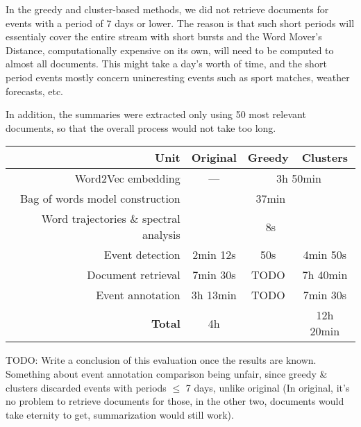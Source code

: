 In the greedy and cluster-based methods, we did not retrieve documents for events with a period of 7 days or lower. The reason is that such short periods will essentialy cover the entire stream with short bursts and the Word Mover's Distance, computationally expensive on its own, will need to be computed to almost all documents. This might take a day's worth of time, and the short period events mostly concern unineresting events such as sport matches, weather forecasts, etc.

In addition, the summaries were extracted only using 50 most relevant documents, so that the overall process would not take too long.

\hspace{\fill}

\begin{minipage}{\linewidth}
\centering
\begin{tabular}{ r c c c }\toprule[1.5pt]
\bf Unit & \bf Original & \bf Greedy & \bf Clusters \\ \midrule
Word2Vec embedding & --- & \multicolumn{2}{c}{3h 50min} \\
Bag of words model construction & \multicolumn{3}{c}{37min} \\
Word trajectories \& spectral analysis & \multicolumn{3}{c}{8s} \\
Event detection & 2min 12s & 50s & 4min 50s \\
Document retrieval & 7min 30s & {\color{red} TODO} & 7h 40min \\
Event annotation & 3h 13min & {\color{red} TODO} & 7min 30s \\ \midrule
\bf Total & 4h & & 12h 20min\\ \bottomrule[1.25pt]

\end{tabular}\par
{} \label{tab:title}
\end{minipage}

\hspace{\fill}

{\color{red} TODO: Write a conclusion of this evaluation once the results are known. Something about event annotation comparison being unfair, since greedy \& clusters discarded events with periods $\leq$ 7 days, unlike original (In original, it's no problem to retrieve documents for those, in the other two, documents would take eternity to get, summarization would still work).}

